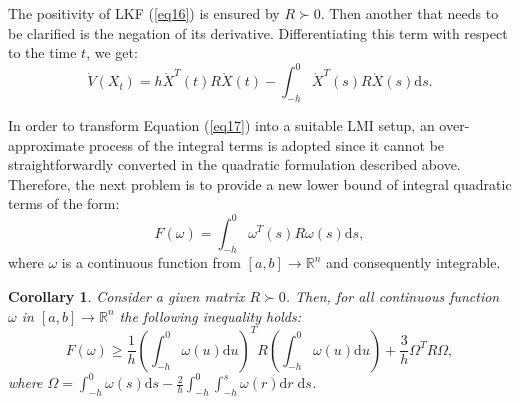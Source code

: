 \documentclass[a4paper]{cas-sc}
\newtheorem{corollary}[theorem]{Corollary}
\begin{document}
The positivity of LKF (\ref{eq16}) is ensured by $ R \succ 0 $. Then another that needs to be clarified is the negation of its derivative. Differentiating this term with respect to the time $t$, we get:
\begin{equation}
  \dot V\left( {{X_t}} \right) = h{\dot X^T}(t)R\dot X(t) - \int_{ - h}^0 {{{\dot X}^T}} (s)R\dot X(s){\text{d}}s.
  \label{eq17}
\end{equation}

In order to transform Equation (\ref{eq17}) into a suitable LMI setup, an over-approximate process of the integral terms is adopted since it cannot be straightforwardly converted in the quadratic formulation described above. Therefore, the next problem is to provide a new lower bound of integral quadratic terms of the form:
\begin{equation}
  F(\omega ) = \int_{ - h}^0 {{\omega ^T}} (s)R\omega (s){\text{d}}s,
  \label{eq18}
\end{equation}
where $ \omega  $ is a continuous function from $ [a,b] \to {\mathbb{R}^n} $ and consequently integrable.

\begin{corollary}
  \label{coro4}
  Consider a given matrix $ R \succ 0 $. Then, for all continuous function $ \omega  $ in $ [a,b] \to {\mathbb{R}^n} $ the following inequality holds:
  \begin{equation}
    F(\omega ) \geqslant \frac{1}{h}{\left( {\int_{ - h}^0 {\omega (u){\text{d}}u} } \right)^T}R\left( {\int_{ - h}^0 {\omega (u){\text{d}}u} } \right) + \frac{3}{h}{\Omega ^T}R\Omega,
    \label{eq19}
  \end{equation}
  where $ \Omega  = \int_{ - h}^0 {\omega (s){\text{d}}s}  - \frac{2}{h}\int_{ - h}^0 {\int_{ - h}^s {\omega (r){\text{d}}r\;{\text{d}}s} }  $.
\end{corollary}
\end{document}
